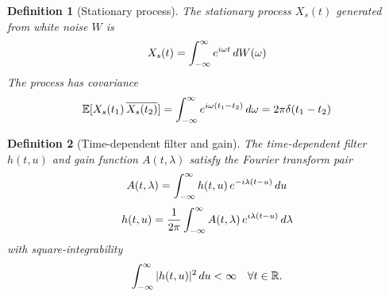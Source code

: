 \documentclass{article}
\newtheorem{definition}{Definition}
\begin{document}
\begin{definition}
  [Stationary process]\label{def:stationary} The stationary process $X_s (t)$
  generated from white noise $W$ is
  \begin{equation}
    \label{eq:stationary-rep} X_s (t) = \int_{- \infty}^{\infty} e^{i \omega
    t}  \hspace{0.17em} dW (\omega)
  \end{equation}
  The process has covariance
  \begin{equation}
    \mathbb{E} [X_s (t_1) \hspace{0.17em} \overline{X_s (t_2)}] = \int_{-
    \infty}^{\infty} e^{i \omega (t_1 - t_2)}  \hspace{0.17em} d \omega = 2
    \pi \delta (t_1 - t_2)
  \end{equation}
\end{definition}

\begin{definition}
  [Time-dependent filter and gain]\label{def:filter-gain} The time-dependent
  filter $h (t, u)$ and gain function $A (t, \lambda)$ satisfy the Fourier
  transform pair
  \begin{equation}
    \label{eq:gain-from-filter} A (t, \lambda) = \int_{- \infty}^{\infty} h
    (t, u)  \hspace{0.17em} e^{- i \lambda (t - u)}  \hspace{0.17em} du
  \end{equation}
  \begin{equation}
    \label{eq:filter-from-gain} h (t, u) = \frac{1}{2 \pi}  \int_{-
    \infty}^{\infty} A (t, \lambda)  \hspace{0.17em} e^{i \lambda (t - u)} 
    \hspace{0.17em} d \lambda
  \end{equation}
  with square-integrability
  \begin{equation}
    \int_{- \infty}^{\infty} |h (t, u) |^2  \hspace{0.17em} du < \infty \quad
    \forall t \in \mathbb{R}.
  \end{equation}
\end{definition}
\end{document}
